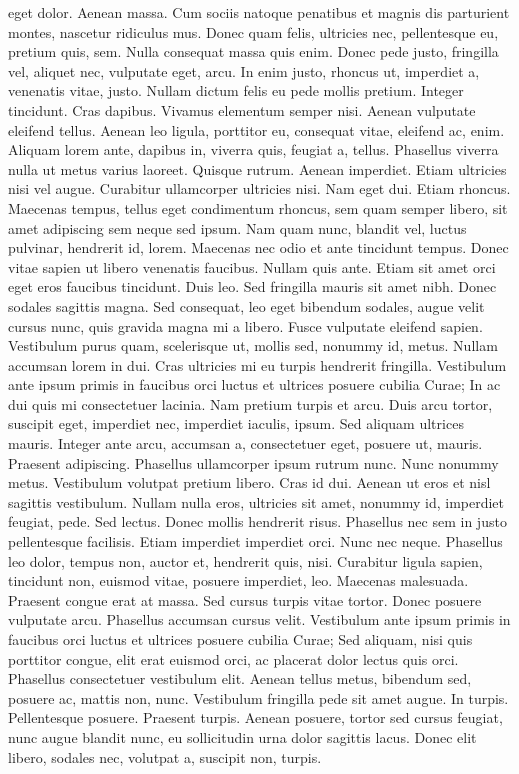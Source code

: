 eget dolor. Aenean massa. Cum sociis natoque penatibus et magnis dis parturient montes, nascetur ridiculus mus. Donec quam felis, ultricies nec, pellentesque eu, pretium quis, sem. Nulla consequat massa quis enim. Donec pede justo, fringilla vel, aliquet nec, vulputate eget, arcu. In enim justo, rhoncus ut, imperdiet a, venenatis vitae, justo. Nullam dictum felis eu pede mollis pretium. Integer tincidunt. Cras dapibus. Vivamus elementum semper nisi. Aenean vulputate eleifend tellus. Aenean leo ligula, porttitor eu, consequat vitae, eleifend ac, enim. Aliquam lorem ante, dapibus in, viverra quis, feugiat a, tellus. Phasellus viverra nulla ut metus varius laoreet. Quisque rutrum. Aenean imperdiet. Etiam ultricies nisi vel augue. Curabitur ullamcorper ultricies nisi. Nam eget dui. Etiam rhoncus. Maecenas tempus, tellus eget condimentum rhoncus, sem quam semper libero, sit amet adipiscing sem neque sed ipsum. Nam quam nunc, blandit vel, luctus pulvinar, hendrerit id, lorem. Maecenas nec odio et ante tincidunt tempus. Donec vitae sapien ut libero venenatis faucibus. Nullam quis ante. Etiam sit amet orci eget eros faucibus tincidunt. Duis leo. Sed fringilla mauris sit amet nibh. Donec sodales sagittis magna. Sed consequat, leo eget bibendum sodales, augue velit cursus nunc, quis gravida magna mi a libero. Fusce vulputate eleifend sapien. Vestibulum purus quam, scelerisque ut, mollis sed, nonummy id, metus. Nullam accumsan lorem in dui. Cras ultricies mi eu turpis hendrerit fringilla. Vestibulum ante ipsum primis in faucibus orci luctus et ultrices posuere cubilia Curae; In ac dui quis mi consectetuer lacinia. Nam pretium turpis et arcu. Duis arcu tortor, suscipit eget, imperdiet nec, imperdiet iaculis, ipsum. Sed aliquam ultrices mauris. Integer ante arcu, accumsan a, consectetuer eget, posuere ut, mauris. Praesent adipiscing. Phasellus ullamcorper ipsum rutrum nunc. Nunc nonummy metus. Vestibulum volutpat pretium libero. Cras id dui. Aenean ut eros et nisl sagittis vestibulum. Nullam nulla eros, ultricies sit amet, nonummy id, imperdiet feugiat, pede. Sed lectus. Donec mollis hendrerit risus. Phasellus nec sem in justo pellentesque facilisis. Etiam imperdiet imperdiet orci. Nunc nec neque. Phasellus leo dolor, tempus non, auctor et, hendrerit quis, nisi. Curabitur ligula sapien, tincidunt non, euismod vitae, posuere imperdiet, leo. Maecenas malesuada. Praesent congue erat at massa. Sed cursus turpis vitae tortor. Donec posuere vulputate arcu. Phasellus accumsan cursus velit. Vestibulum ante ipsum primis in faucibus orci luctus et ultrices posuere cubilia Curae; Sed aliquam, nisi quis porttitor congue, elit erat euismod orci, ac placerat dolor lectus quis orci. Phasellus consectetuer vestibulum elit. Aenean tellus metus, bibendum sed, posuere ac, mattis non, nunc. Vestibulum fringilla pede sit amet augue. In turpis. Pellentesque posuere. Praesent turpis. Aenean posuere, tortor sed cursus feugiat, nunc augue blandit nunc, eu sollicitudin urna dolor sagittis lacus. Donec elit libero, sodales nec, volutpat a, suscipit non, turpis.


